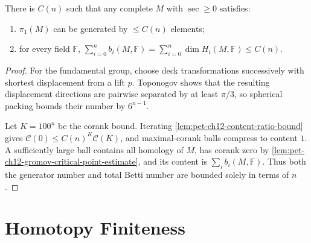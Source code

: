 \begin{theorem}
  \label{thm:pet-ch12-betti-number-finiteness}
  There is $C(n)$ such that any complete $M$ with $\sec\ge0$ satisfies:
  \begin{enumerate}
    \item $\pi_1(M)$ can be generated by $\le C(n)$ elements;
    \item for every field $\mathbb{F}$,
      $\sum_{i=0}^n b_i(M,\mathbb{F})=\sum_{i=0}^n\dim H_i(M,\mathbb{F})\le C(n)$.
  \end{enumerate}
\end{theorem}
\begin{proof}
  \sketch
  For the fundamental group, choose deck transformations successively with
  shortest displacement from a lift \(p\). Toponogov shows that the resulting
  displacement directions are pairwise separated by at least \(\pi/3\), so
  spherical packing bounds their number by \(6^{n-1}\).

  Let \(K=100^n\) be the corank bound. Iterating
  \cref{lem:pet-ch12-content-ratio-bound}
  gives \(\mathcal C(0)\le C(n)^K\mathcal C(K)\), and maximal-corank balls
  compress to content \(1\). A sufficiently large ball contains all homology
  of \(M\), has corank zero by
  \cref{lem:pet-ch12-gromov-critical-point-estimate}, and its content is
  \(\sum_i b_i(M,\mathbb F)\). Thus both the generator number and total Betti
  number are bounded solely in terms of \(n\).
\end{proof}

\section{Homotopy Finiteness}

